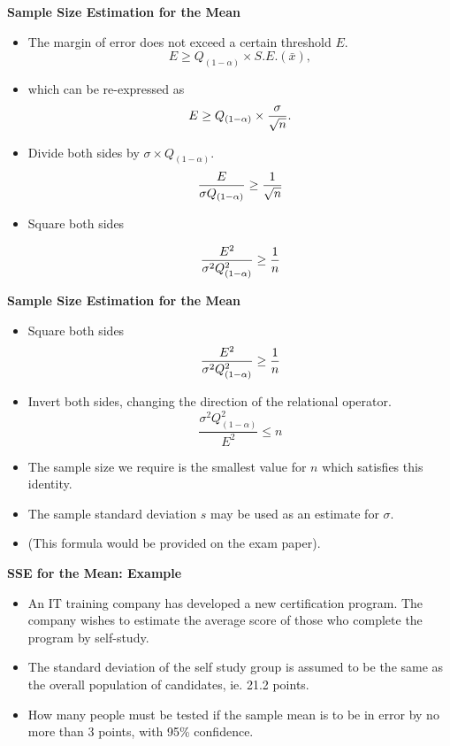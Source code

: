 \documentclass[]{report}
\begin{document}

\textbf{Sample Size Estimation for the Mean}

\begin{itemize}

\item  The margin of error does not exceed a certain threshold $E$.
\[ E \geq Q_{(1-\alpha)} \times S.E.(\bar{x}), \]

\item  which can be re-expressed as
\[E \geq Q_{(1-\alpha)} \times {\sigma \over \sqrt{n} }.\]

\item  Divide both sides by $\sigma \times Q_{(1-\alpha)}$.
\[ \frac{E}{\sigma Q_{(1-\alpha)}} \geq {1 \over \sqrt{n} } \]

\item  Square both sides

\[ \frac{E^2}{\sigma^2 Q_{(1-\alpha)}^2} \geq {1 \over n } \]

\end{itemize}


\textbf{Sample Size Estimation for the Mean}
\begin{itemize}
\item  Square both sides
\[ \frac{E^2}{\sigma^2 Q^2_{(1-\alpha)}} \geq {1 \over n } \]
\item  Invert both sides, changing the direction of the relational operator.
\[ \frac{\sigma^2 Q^2_{(1-\alpha)}}{E^2} \leq n \]

\item  The sample size we require is the smallest value for $n$ which satisfies this identity.
\item  The sample standard deviation $s$ may be used as an estimate for $\sigma$.
\item  (This formula would be provided on the exam paper).
\end{itemize}



\textbf{SSE for the Mean: Example}
\begin{itemize}
\item  An IT training company has developed a new certification program. The company wishes to estimate the average score of those who complete the program by self-study.  \item  The standard deviation of the self study group is assumed to be the same as the overall population of candidates, ie. 21.2 points.
\item  How many people must be tested if the sample mean is to be in error by no more than 3 points, with 95\% confidence.
\end{itemize}
\end{document}
